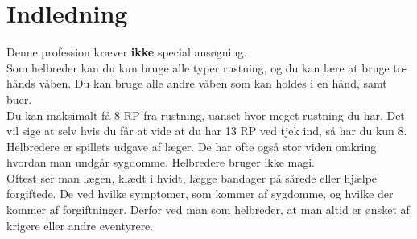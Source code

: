 \chapter{Indledning}

Denne profession kræver \textbf{ikke} special ansøgning.\\
Som helbreder kan du kun bruge alle typer rustning, og du kan lære at bruge to-hånds våben. Du kan bruge alle andre våben som kan holdes i en hånd, samt buer.\\
Du kan maksimalt få 8 RP fra rustning, uanset hvor meget rustning du har. Det vil sige at selv hvis du får at vide at du har 13 RP ved tjek ind, så har du kun 8.\\

Helbredere er spillets udgave af læger. De har ofte også stor viden omkring hvordan man undgår sygdomme. Helbredere bruger ikke magi.\\ Oftest ser man lægen, klædt i hvidt,  lægge bandager på sårede eller hjælpe forgiftede. De ved hvilke symptomer, som kommer af sygdomme, og hvilke der kommer af forgiftninger. Derfor ved man som helbreder, at man altid er ønsket af krigere eller andre eventyrere.

